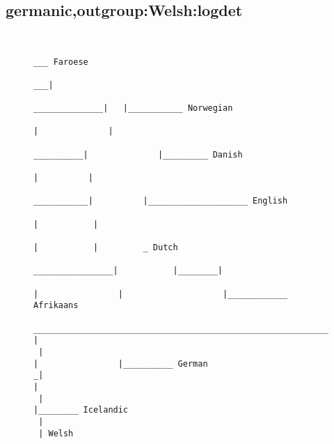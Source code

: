 \subsection{germanic,outgroup:Welsh:logdet}
\begin{figure}[H]
\begin{center}
{
\selectfont
\begin{verbatim}

                                                                                                                                        ___ Faroese
                                                                                                                                    ___|
                                                                                                                     ______________|   |___________ Norwegian
                                                                                                                    |              |
                                                                                                          __________|              |_________ Danish
                                                                                                         |          |
                                                                                              ___________|          |____________________ English
                                                                                             |           |
                                                                                             |           |         _ Dutch
                                                                             ________________|           |________|
                                                                            |                |                    |____________ Afrikaans
  __________________________________________________________________________|                |
 |                                                                          |                |__________ German
_|                                                                          |
 |                                                                          |________ Icelandic
 |
 | Welsh



\end{verbatim}
}
\label{...}
\end{center}
\end{figure}
